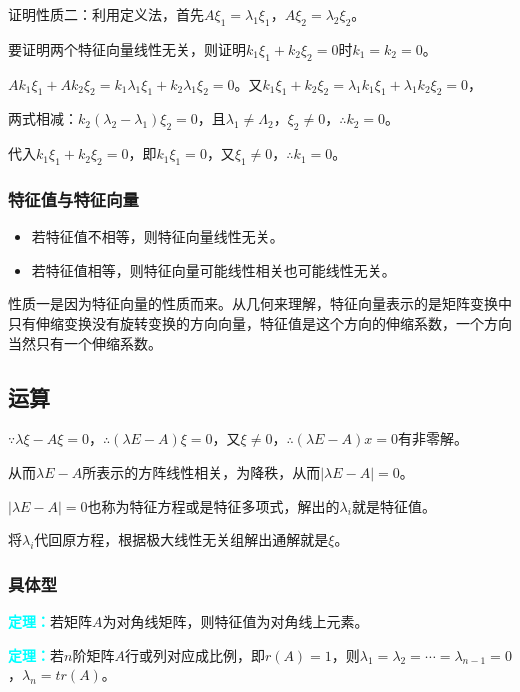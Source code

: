 \documentclass[UTF8, 12pt]{ctexart}
\begin{document}
证明性质二：利用定义法，首先$A\xi_1=\lambda_1\xi_1$，$A\xi_2=\lambda_2\xi_2$。

要证明两个特征向量线性无关，则证明$k_1\xi_1+k_2\xi_2=0$时$k_1=k_2=0$。

$Ak_1\xi_1+Ak_2\xi_2=k_1\lambda_1\xi_1+k_2\lambda_1\xi_2=0$。又$k_1\xi_1+k_2\xi_2=\lambda_1k_1\xi_1+\lambda_1k_2\xi_2=0$，

两式相减：$k_2(\lambda_2-\lambda_1)\xi_2=0$，且$\lambda_1\neq\Lambda_2$，$\xi_2\neq0$，$\therefore k_2=0$。

代入$k_1\xi_1+k_2\xi_2=0$，即$k_1\xi_1=0$，又$\xi_1\neq0$，$\therefore k_1=0$。

\subsubsection{特征值与特征向量}

\begin{itemize}
    \item 若特征值不相等，则特征向量线性无关。
    \item 若特征值相等，则特征向量可能线性相关也可能线性无关。
\end{itemize}

性质一是因为特征向量的性质而来。从几何来理解，特征向量表示的是矩阵变换中只有伸缩变换没有旋转变换的方向向量，特征值是这个方向的伸缩系数，一个方向当然只有一个伸缩系数。

\subsection{运算}

$\because\lambda\xi-A\xi=0$，$\therefore(\lambda E-A)\xi=0$，又$\xi\neq0$，$\therefore(\lambda E-A)x=0$有非零解。

从而$\lambda E-A$所表示的方阵线性相关，为降秩，从而$\vert\lambda E-A\vert=0$。

$\vert\lambda E-A\vert=0$也称为特征方程或是特征多项式，解出的$\lambda_i$就是特征值。

将$\lambda_i$代回原方程，根据极大线性无关组解出通解就是$\xi$。

\subsubsection{具体型}

\textcolor{aqua}{\textbf{定理：}}若矩阵$A$为对角线矩阵，则特征值为对角线上元素。

\textcolor{aqua}{\textbf{定理：}}若$n$阶矩阵$A$行或列对应成比例，即$r(A)=1$，则$\lambda_1=\lambda_2=\cdots=\lambda_{n-1}=0$，$\lambda_n=tr(A)$。
\end{document}
